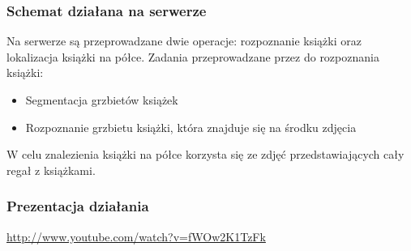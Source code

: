 \begin{frame}
    \frametitle{Schemat działana na serwerze}
    Na serwerze są przeprowadzane dwie operacje: rozpoznanie książki oraz lokalizacja książki na półce.
    Zadania przeprowadzane przez do rozpoznania książki:
    \begin{itemize}
        \item Segmentacja grzbietów książek
        \item Rozpoznanie grzbietu książki, która znajduje się na środku zdjęcia
    \end{itemize}

    W celu znalezienia książki na półce korzysta się ze zdjęć przedstawiających cały regał z książkami.
\end{frame}

\begin{frame}
    \frametitle{Prezentacja działania}
        \url{http://www.youtube.com/watch?v=fWOw2K1TzFk}
\end{frame}
